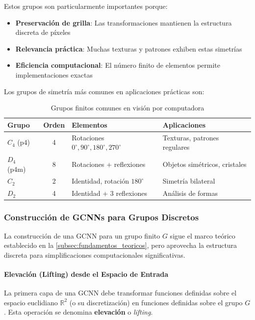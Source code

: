Estos grupos son particularmente importantes porque:
\begin{itemize}
    \item \textbf{Preservación de grilla}: Las transformaciones mantienen la estructura discreta de píxeles
    \item \textbf{Relevancia práctica}: Muchas texturas y patrones exhiben estas simetrías
    \item \textbf{Eficiencia computacional}: El número finito de elementos permite implementaciones exactas
\end{itemize}

Los grupos de simetría más comunes en aplicaciones prácticas son:

\begin{table}[h]
\centering
\begin{tabular}{|l|c|l|l|}
\hline
\textbf{Grupo} & \textbf{Orden} & \textbf{Elementos} & \textbf{Aplicaciones} \\
\hline
$C_4$ (p4) & 4 & Rotaciones $0^\circ, 90^\circ, 180^\circ, 270^\circ$ & Texturas, patrones regulares \\
$D_4$ (p4m) & 8 & Rotaciones + reflexiones & Objetos simétricos, cristales \\
$C_2$ & 2 & Identidad, rotación $180^\circ$ & Simetría bilateral \\
$D_2$ & 4 & Identidad + 3 reflexiones & Análisis de formas \\
\hline
\end{tabular}
\caption{Grupos finitos comunes en visión por computadora}
\label{tab:grupos_finitos}
\end{table}

\subsubsection[Construcción de GCNNs para Grupos Discretos]{Construcción de \glspl{GCNN} para Grupos Discretos}

La construcción de una \gls{GCNN} para un grupo finito $G$ sigue el marco teórico establecido en la \autoref{subsec:fundamentos_teoricos}, pero aprovecha la estructura discreta para simplificaciones computacionales significativas.

\paragraph{Elevación (Lifting) desde el Espacio de Entrada}

La primera capa de una \gls{GCNN} debe transformar funciones definidas sobre el espacio euclidiano $\mathbb{R}^2$ (o su discretización) en funciones definidas sobre el grupo $G$. Esta operación se denomina \textbf{elevación} o \textit{lifting}.

